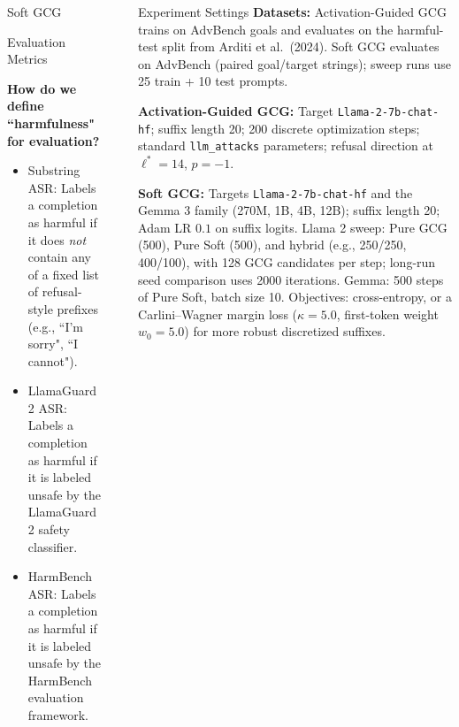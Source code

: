 \documentclass[final]{beamer}
\newlength{\sepwidth}
\newlength{\colwidth}
\newcommand{\separatorcolumn}{\begin{column}{\sepwidth}\end{column}}
\begin{document}
\begin{frame}[t]
\begin{columns}[t]
\begin{column}{\colwidth}
\begin{alertblock}{Soft GCG}
  \end{alertblock}

  \begin{block}{Evaluation Metrics}

    \textbf{How do we define ``harmfulness" for evaluation?}
    \begin{itemize}
        \item Substring ASR: Labels a completion as harmful if it does \textit{not} contain any of a fixed list of refusal-style prefixes (e.g., ``I'm sorry", ``I cannot").
        \item LlamaGuard2 ASR: Labels a completion as harmful if it is labeled unsafe by the LlamaGuard2 safety classifier.
        \item HarmBench ASR: Labels a completion as harmful if it is labeled unsafe by the HarmBench evaluation framework.
    \end{itemize}

  \end{block}

\end{column}

\separatorcolumn

\begin{column}{\colwidth}

  \begin{alertblock}{Experiment Settings}
      \textbf{Datasets:} Activation-Guided GCG trains on AdvBench goals and evaluates on the harmful-test split from Arditi et al.\ (2024). Soft GCG evaluates on AdvBench (paired goal/target strings); sweep runs use 25 train + 10 test prompts.

      \vspace{0.5em}

      \textbf{Activation-Guided GCG:} Target \texttt{Llama-2-7b-chat-hf}; suffix length 20; 200 discrete optimization steps; standard \texttt{llm\_attacks} parameters; refusal direction at $\ell^*=14$, $p=-1$.

      \vspace{0.5em}

      \textbf{Soft GCG:} Targets \texttt{Llama-2-7b-chat-hf} and the Gemma 3 family (270M, 1B, 4B, 12B); suffix length 20; Adam LR $0.1$ on suffix logits. Llama 2 sweep: Pure GCG (500), Pure Soft (500), and hybrid (e.g., 250/250, 400/100), with 128 GCG candidates per step; long-run seed comparison uses 2000 iterations. Gemma: 500 steps of Pure Soft, batch size 10. Objectives: cross-entropy, or a Carlini--Wagner margin loss ($\kappa=5.0$, first-token weight $w_0=5.0$) for more robust discretized suffixes.
  \end{alertblock}



\end{column}
\end{columns}
\end{frame}
\end{document}
